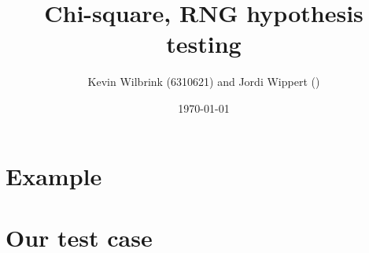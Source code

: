\documentclass[12pt]{article}
\title{\textbf{Chi-square, RNG hypothesis testing}}
\date{\today}
\author{Kevin Wilbrink (6310621) and Jordi Wippert ()}
\begin{document}
	\maketitle

	\begin{multicols*}{2}
		\section{Example}
		
		\section{Our test case}
		
		\printbibliography
	\end{multicols*}
\end{document}

